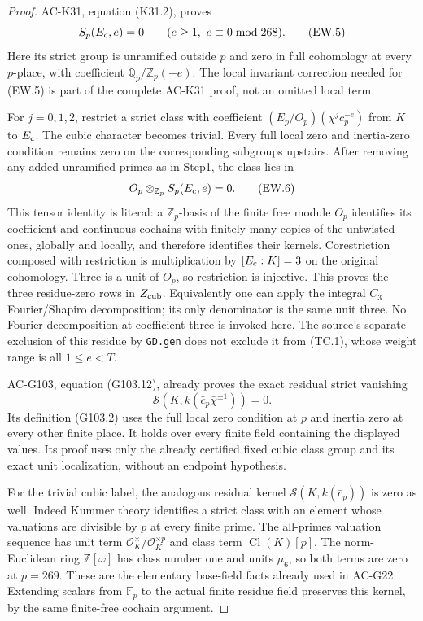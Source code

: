\begin{proof}
AC-K31, equation (K31.2), proves
\[
             S_p(E_{\rm c},e)=0
                 \qquad(e\geq1,\ e\equiv0\bmod268).
 \tag{EW.5}
\]
Here its strict group is unramified outside $p$ and zero in full
cohomology at every $p$-place, with coefficient
$\mathbb Q_p/\mathbb Z_p(-e)$.
The local invariant correction needed for (EW.5) is part of the
complete AC-K31 proof, not an omitted local term.

For $j=0,1,2$, restrict a strict class with coefficient
$(E_p/O_p)(\chi^j c_p^{-e})$ from $K$ to $E_{\rm c}$.
The cubic character becomes trivial.
Every full local zero and inertia-zero condition remains zero
on the corresponding subgroups upstairs.
After removing any added unramified primes as in Step1, the class lies in
\[
                  O_p\otimes_{\mathbb Z_p}S_p(E_{\rm c},e)=0 .
 \tag{EW.6}
\]
This tensor identity is literal: a $\mathbb Z_p$-basis of the
finite free module $O_p$ identifies its coefficient and continuous
cochains with finitely many copies of the untwisted ones, globally
and locally, and therefore identifies their kernels.
Corestriction composed with restriction is multiplication by
$[E_{\rm c}:K]=3$ on the original cohomology.
Three is a unit of $O_p$, so restriction is injective.
This proves the three residue-zero rows in $Z_{\rm cub}$.
Equivalently one can apply the integral $C_3$ Fourier/Shapiro
decomposition; its only denominator is the same unit three.
No Fourier decomposition at coefficient three is invoked here.
The source's separate exclusion of this residue by \texttt{GD.gen}
does not exclude it from (TC.1), whose weight range is all $1\leq e<T$.

AC-G103, equation (G103.12), already proves the exact residual
strict vanishing
\[
             \mathcal S(K,k(\bar c_p\bar\chi^{\pm1}))=0.
 \tag{EW.7}
\]
Its definition (G103.2) uses the full local zero condition at $p$
and inertia zero at every other finite place.
It holds over every finite field containing the displayed values.
Its proof uses only the already certified fixed cubic class group
and its exact unit localization, without an endpoint hypothesis.

For the trivial cubic label, the analogous residual kernel
$\mathcal S(K,k(\bar c_p))$ is zero as well.
Indeed Kummer theory identifies a strict class with an element
whose valuations are divisible by $p$ at every finite prime.
The all-primes valuation sequence has unit term
$\mathcal O_K^\times/\mathcal O_K^{\times p}$ and class term
$\operatorname{Cl}(K)[p]$.  The norm-Euclidean ring
$\mathbb Z[\omega]$ has class number one and units $\mu_6$,
so both terms are zero at $p=269$.
These are the elementary base-field facts already used in AC-G22.
Extending scalars from $\mathbb F_p$ to the actual finite residue
field preserves this kernel, by the same finite-free cochain argument.


\end{proof}
